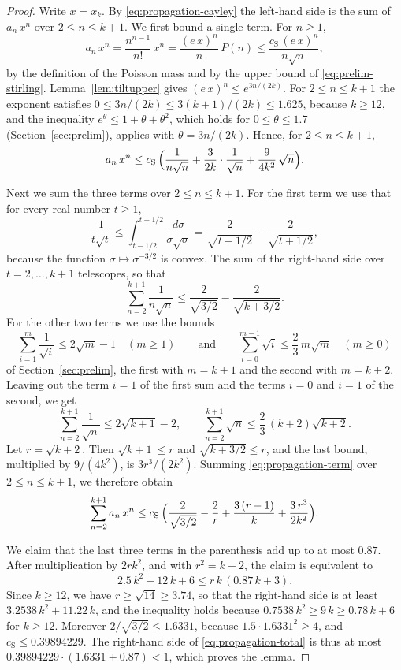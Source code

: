 \documentclass{amsart}
\theoremstyle{definition}
\theoremstyle{remark}
\numberwithin{equation}{section}
\begin{document}
\begin{proof}
Write $x=x_k$. By \eqref{eq:propagation-cayley} the left-hand side is the sum
of $a_n\,x^n$ over $2\le n\le k+1$. We first bound a single term.
For $n\ge1$,
\[
a_n\,x^n=\frac{n^{n-1}}{n!}\,x^n=\frac{(e\,x)^n}{n}\,P(n)
\le\frac{c_{\mathrm S}\,(e\,x)^n}{n\sqrt n} ,
\]
by the definition of the Poisson mass and by the upper bound of
\eqref{eq:prelim-stirling}.
Lemma~\ref{lem:tiltupper} gives $(e\,x)^n\le e^{3n/(2k)}$. For
$2\le n\le k+1$ the exponent satisfies
$0\le3n/(2k)\le3(k+1)/(2k)\le1.625$, because $k\ge12$, and the inequality
$e^{\theta}\le1+\theta+\theta^2$, which holds for $0\le\theta\le1.7$
(Section~\ref{sec:prelim}), applies with $\theta=3n/(2k)$. Hence, for
$2\le n\le k+1$,
\begin{equation}\label{eq:propagation-term}
a_n\,x^n\le c_{\mathrm S}\,\Bigl(\frac{1}{n\sqrt n}
+\frac{3}{2k}\cdot\frac{1}{\sqrt n}+\frac{9}{4k^2}\,\sqrt n\Bigr).
\end{equation}

Next we sum the three terms over $2\le n\le k+1$. For the first term we use
that for every real number $t\ge1$,
\[
\frac{1}{t\sqrt t}\le\int_{t-1/2}^{t+1/2}\frac{d\sigma}{\sigma\sqrt\sigma}
=\frac{2}{\sqrt{t-1/2}}-\frac{2}{\sqrt{t+1/2}} ,
\]
because the function $\sigma\mapsto\sigma^{-3/2}$ is convex. The sum of the
right-hand side over $t=2,\dots,k+1$ telescopes, so that
\[
\sum_{n=2}^{k+1}\frac{1}{n\sqrt n}
\le\frac{2}{\sqrt{3/2}}-\frac{2}{\sqrt{k+3/2}} .
\]
For the other two terms we use the bounds
\[
\sum_{i=1}^{m}\frac{1}{\sqrt i}\le2\sqrt m-1\quad(m\ge1)
\qquad\text{and}\qquad
\sum_{i=0}^{m-1}\sqrt i\le\frac23\,m\sqrt m\quad(m\ge0)
\]
of Section~\ref{sec:prelim}, the first with $m=k+1$ and the second with
$m=k+2$. Leaving out the term $i=1$ of the first sum and the terms $i=0$ and
$i=1$ of the second, we get
\[
\sum_{n=2}^{k+1}\frac{1}{\sqrt n}\le2\sqrt{k+1}-2,\qquad
\sum_{n=2}^{k+1}\sqrt n\le\frac23\,(k+2)\sqrt{k+2} .
\]
Let $r=\sqrt{k+2}$. Then $\sqrt{k+1}\le r$ and $\sqrt{k+3/2}\le r$, and the
last bound, multiplied by $9/(4k^2)$, is $3r^3/(2k^2)$. Summing
\eqref{eq:propagation-term} over $2\le n\le k+1$, we therefore obtain
\begin{equation}\label{eq:propagation-total}
\sum_{n=2}^{k+1}a_n\,x^n\le c_{\mathrm S}\,\Bigl(\frac{2}{\sqrt{3/2}}
-\frac2r+\frac{3\,(r-1)}{k}+\frac{3\,r^3}{2k^2}\Bigr).
\end{equation}

We claim that the last three terms in the parenthesis add up to at most
$0.87$. After multiplication by $2rk^2$, and with $r^2=k+2$, the claim is
equivalent to
\[
2.5\,k^2+12\,k+6\le r\,k\,(0.87\,k+3).
\]
Since $k\ge12$, we have $r\ge\sqrt{14}\ge3.74$, so that the right-hand side
is at least $3.2538\,k^2+11.22\,k$, and the inequality holds because
$0.7538\,k^2\ge9\,k\ge0.78\,k+6$ for $k\ge12$. Moreover
$2/\sqrt{3/2}\le1.6331$, because $1.5\cdot1.6331^2\ge4$, and
$c_{\mathrm S}\le0.39894229$. The right-hand side of
\eqref{eq:propagation-total} is thus at most
$0.39894229\cdot(1.6331+0.87)<1$, which proves the lemma.
\end{proof}
\end{document}
